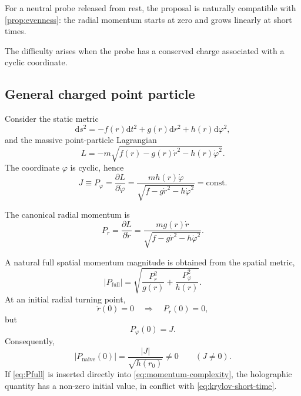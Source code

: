 \documentclass[11pt,a4paper]{article}
\theoremstyle{plain}
\theoremstyle{definition}
\theoremstyle{remark}
\begin{document}
For a neutral probe released from rest, the proposal is naturally compatible with \cref{prop:evenness}: the radial momentum starts at zero and grows linearly at short times.

The difficulty arises when the probe has a conserved charge associated with a cyclic coordinate.

\subsection{General charged point particle}

Consider the static metric
\begin{equation*}
\mathrm d s^2
=
-f(r)\mathrm d t^2
+g(r)\mathrm d r^2
+h(r)\mathrm d\varphi^2,
\end{equation*}
and the massive point-particle Lagrangian
\begin{equation*}
L
=
-m\sqrt{
f(r)-g(r)\dot r^2-h(r)\dot\varphi^2
}.
\end{equation*}
The coordinate $\varphi$ is cyclic, hence
\begin{equation}
J
\equiv
P_\varphi
=
\frac{\partial L}{\partial\dot\varphi}
=
\frac{m h(r)\dot\varphi}
{\sqrt{f-g\dot r^2-h\dot\varphi^2}}
=
\mathrm{const}.
\label{eq:J-definition}
\end{equation}

The canonical radial momentum is
\begin{equation*}
P_r
=
\frac{\partial L}{\partial\dot r}
=
\frac{m g(r)\dot r}
{\sqrt{f-g\dot r^2-h\dot\varphi^2}}.
\end{equation*}

A natural full spatial momentum magnitude is obtained from the spatial metric,
\begin{equation}
|P_{\mathrm{full}}|
=
\sqrt{\frac{P_r^2}{g(r)}
+\frac{P_\varphi^2}{h(r)}}.
\label{eq:Pfull}
\end{equation}
At an initial radial turning point,
\begin{equation*}
\dot r(0)=0
\quad\Longrightarrow\quad
P_r(0)=0,
\end{equation*}
but
\begin{equation*}
P_\varphi(0)=J.
\end{equation*}
Consequently,
\begin{equation}
\boxed{
|P_{\mathrm{naive}}(0)|
=
\frac{|J|}{\sqrt{h(r_0)}}
\neq0
\qquad (J\neq0).
}
\label{eq:naive-intercept}
\end{equation}
If \eqref{eq:Pfull} is inserted directly into \eqref{eq:momentum-complexity}, the holographic quantity has a non-zero initial value, in conflict with \eqref{eq:krylov-short-time}.
\end{document}

